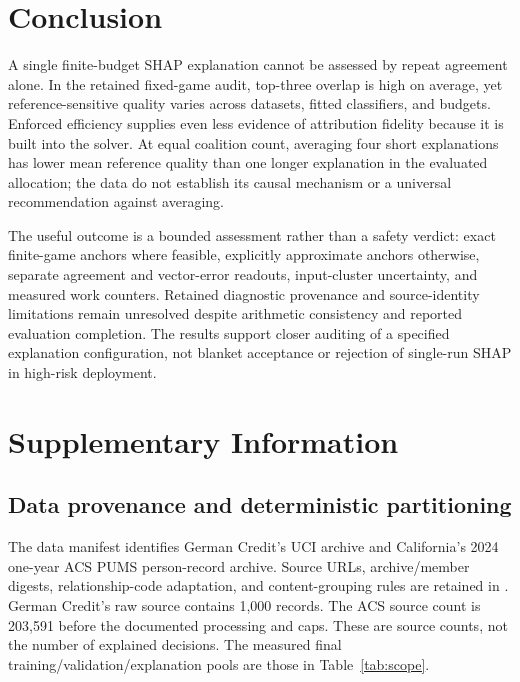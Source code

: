 \documentclass{article}
\begin{document}
\section{Conclusion}
A single finite-budget SHAP explanation cannot be assessed by repeat agreement alone. In the retained fixed-game audit, top-three overlap is high on average, yet reference-sensitive quality varies across datasets, fitted classifiers, and budgets. Enforced efficiency supplies even less evidence of attribution fidelity because it is built into the solver. At equal coalition count, averaging four short explanations has lower mean reference quality than one longer explanation in the evaluated allocation; the data do not establish its causal mechanism or a universal recommendation against averaging.

The useful outcome is a bounded assessment rather than a safety verdict: exact finite-game anchors where feasible, explicitly approximate anchors otherwise, separate agreement and vector-error readouts, input-cluster uncertainty, and measured work counters. Retained diagnostic provenance and source-identity limitations remain unresolved despite arithmetic consistency and reported evaluation completion. The results support closer auditing of a specified explanation configuration, not blanket acceptance or rejection of single-run SHAP in high-risk deployment.

\clearpage



\clearpage
\appendix
\section{Supplementary Information}
\subsection{Data provenance and deterministic partitioning}
The data manifest identifies German Credit's UCI archive and California's 2024 one-year ACS PUMS person-record archive. Source URLs, archive/member digests, relationship-code adaptation, and content-grouping rules are retained in . German Credit's raw source contains 1,000 records. The ACS source count is 203,591 before the documented processing and caps. These are source counts, not the number of explained decisions. The measured final training/validation/explanation pools are those in Table~\ref{tab:scope}.
\end{document}
